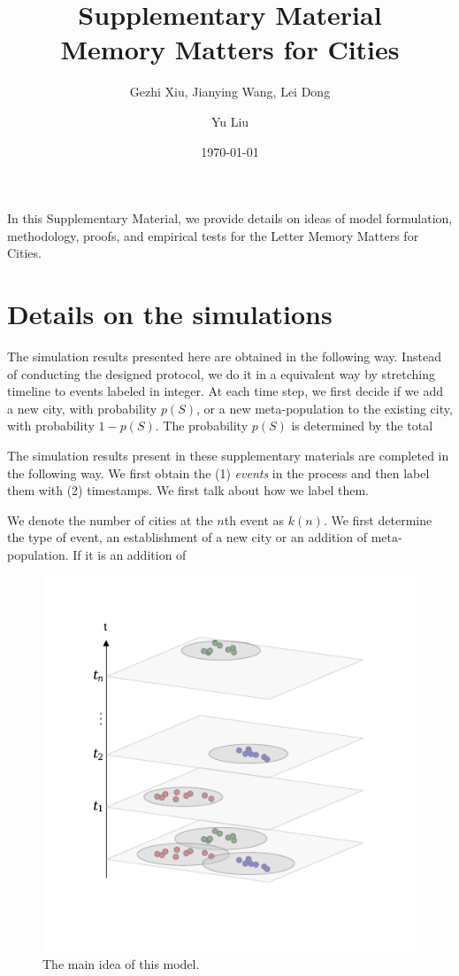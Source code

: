 \documentclass[aps,prl]{revtex4-2}
\begin{document}
\title{Supplementary Material\\Memory Matters for Cities}
\date{\today}
\author{Gezhi Xiu, Jianying Wang, Lei Dong}

\author{Yu Liu}

\pacs{} 



\maketitle
\tableofcontents
\vspace{1cm}

In this Supplementary Material, we provide details on ideas of model formulation, methodology, proofs, and empirical tests for the Letter Memory Matters for Cities.
\section{Details on the simulations}

The simulation results presented here are obtained in the following way. Instead of conducting the designed protocol, we do it in a equivalent way by stretching timeline to events labeled in integer. At each time step, we first decide if we add a new city, with probability $p(S)$, or a new meta-population to the existing city, with probability $1-p(S)$. The probability $p(S)$ is determined by the total 

The simulation results present in these supplementary materials are completed in the following way. We first obtain the (1) \emph{events} in the process and then label them with (2) timestamps. We first talk about how we label them. 

We denote the number of cities at the $n$th event as $k(n)$. We first determine the type of event, an establishment of a new city or an addition of meta-population. If it is an addition of 

\begin{figure}
	\centering
	\includegraphics[width=0.5\linewidth]{./fig/mechan.pdf}
	\caption{The main idea of this model.}
\end{figure}
\end{document}
